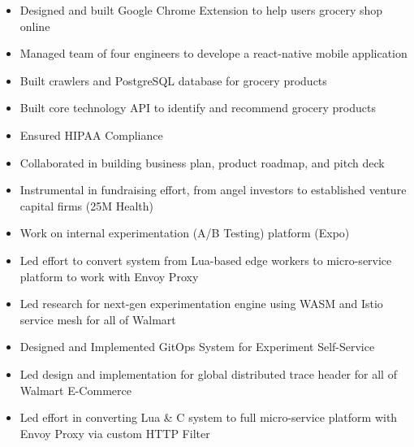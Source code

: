 \documentclass[10pt,a4paper,ragged2e,withhyper]{altacv}
\begin{document}
\begin{paracol}{2}

  \begin{itemize}
    \item Designed and built Google Chrome Extension to help users grocery shop online
    \item Managed team of four engineers to develope a react-native mobile application
    \item Built crawlers and PostgreSQL database for grocery products
    \item Built core technology API to identify and recommend grocery products
    \item Ensured HIPAA Compliance
    \item Collaborated in building business plan, product roadmap, and pitch deck
    \item Instrumental in fundraising effort, from angel investors to established venture capital firms (25M Health)
  \end{itemize}

  \divider

  \begin{itemize}
    \item Work on internal experimentation (A/B Testing) platform (Expo)
    \item Led effort to convert system from Lua-based edge workers to micro-service platform to work with Envoy Proxy
    \item Led research for next-gen experimentation engine using WASM and Istio service mesh for all of Walmart %
    \item Designed and Implemented GitOps System for Experiment Self-Service
    \item Led design and implementation for global distributed trace header for all of Walmart E-Commerce %
    \item Led effort in converting Lua \& C system to full micro-service platform with Envoy Proxy via custom HTTP Filter
  \end{itemize}



\end{paracol}
\end{document}
